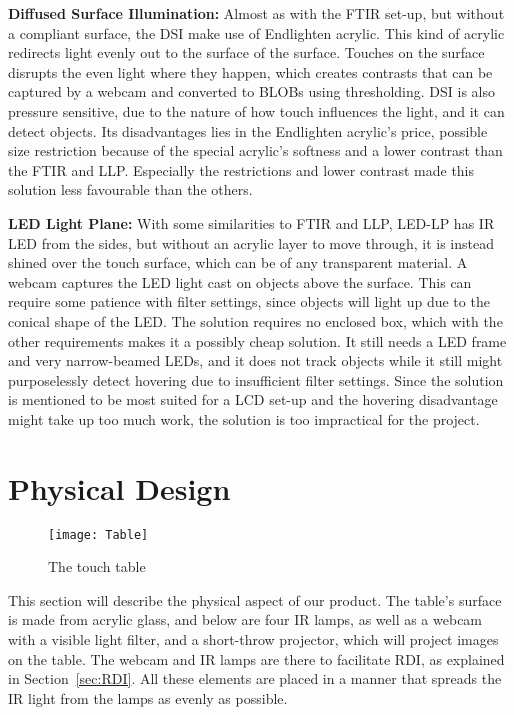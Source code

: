 \textbf{Diffused Surface Illumination:} Almost as with the FTIR set-up, but without a compliant surface, the DSI make use of Endlighten acrylic. This kind of acrylic redirects light evenly out to the surface of the surface.  Touches on the surface disrupts the even light where they happen, which creates contrasts that can be captured by a webcam and converted to BLOBs using thresholding. DSI is also pressure sensitive, due to the nature of how touch influences the light, and it can detect objects. Its disadvantages lies in the Endlighten acrylic's price, possible size restriction because of the special acrylic's softness and a lower contrast than the FTIR and LLP. Especially the restrictions and lower contrast made this solution less favourable than the others.

\textbf{LED Light Plane:} With some similarities to FTIR and LLP, LED-LP has IR LED from the sides, but without an acrylic layer to move through, it is instead shined over the touch surface, which can be of any transparent material. A webcam captures the LED light cast on objects above the surface. This can require some patience with filter settings, since objects will light up due to the conical shape of the LED. The solution requires no enclosed box, which with the other requirements makes it a possibly cheap solution. It still needs a LED frame and very narrow-beamed LEDs, and it does not track objects while it still might purposelessly detect hovering due to insufficient filter settings. Since the solution is mentioned to be most suited for a LCD set-up and the hovering disadvantage might take up too much work, the solution is too impractical for the project.

\section{Physical Design} 
\begin{figure} [!h]
\centering \texttt{[image: Table]}
 \caption{The touch table \label{Fig:Table}}
\end{figure}
This section will describe the physical aspect of our product.
The table's surface is made from acrylic glass, and below are four IR lamps, as well as a webcam with a visible light filter, and a short-throw projector, which will project images on the table. The webcam and IR lamps are there to facilitate RDI, as explained in Section~\ref{sec:RDI}. All these elements are placed in a manner that spreads the IR light from the lamps as evenly as possible.

